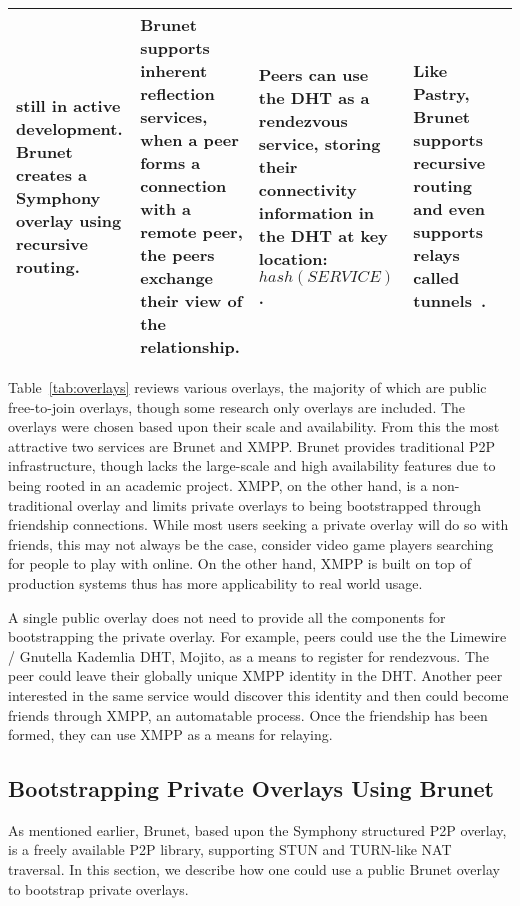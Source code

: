 \documentclass[conference]{IEEEtran}
\begin{document}
\begin{table*}[h!t!]
\begin{tabular}[c]{|m{1.5cm}||m{5.5cm}|m{3cm}|m{3cm}|m{3cm}|}
still in active development.  Brunet creates a Symphony~\cite{symphony} overlay
using recursive routing.
&
Brunet supports inherent reflection services, when a peer forms a connection
with a remote peer, the peers exchange their view of the relationship.
&
Peers can use the DHT as a rendezvous service, storing their connectivity
information in the DHT at key location:  $hash(SERVICE)$.
&
Like Pastry, Brunet supports recursive routing and even supports relays called
tunnels~\cite{hpdc08_0}.
\\ \hline
\end{tabular}
\caption{}
\label{tab:overlays}
\end{table*}

Table~\ref{tab:overlays} reviews various overlays, the majority of which are
public free-to-join overlays, though some research only overlays are included.
The overlays were chosen based upon their scale and availability.  From this
the most attractive two services are Brunet and XMPP.  Brunet provides
traditional P2P infrastructure, though lacks the large-scale and high
availability features due to being rooted in an academic project.  XMPP,
on the other hand, is a non-traditional overlay and limits private overlays
to being bootstrapped through friendship connections.  While most users
seeking a private overlay will do so with friends, this may not always be the
case, consider video game players searching for people to play with online.
On the other hand, XMPP is built on top of production systems thus has
more applicability to real world usage.

A single public overlay does not need to provide all the components for
bootstrapping the private overlay.  For example, peers could use the the
Limewire / Gnutella Kademlia DHT, Mojito, as a means to register for
rendezvous.  The peer could leave their globally unique XMPP identity in the
DHT.  Another peer interested in the same service would discover this identity
and then could become friends through XMPP, an automatable process.  Once the
friendship has been formed, they can use XMPP as a means for relaying.

\subsection{Bootstrapping Private Overlays Using Brunet}
\label{brunet_bootstrapping}

As mentioned earlier, Brunet, based upon the Symphony structured P2P overlay,
is a freely available P2P library, supporting STUN and TURN-like NAT traversal.
In this section, we describe how one could use a public Brunet overlay to
bootstrap private overlays.  
\end{document}
